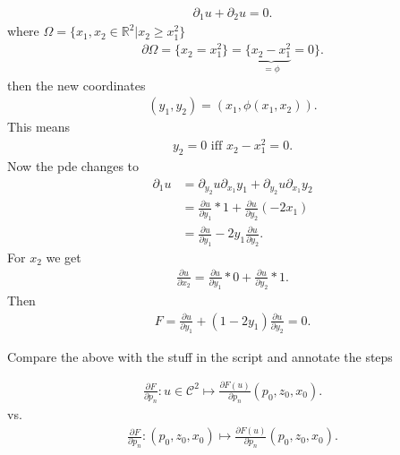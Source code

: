 \begin{example}
 \begin{align*}
  \partial_1 u + \partial_2 u = 0
 .\end{align*} 
 where $\Omega  = \{x_{1},x_{2} \in  \mathbb{R}^{2} | x_{2} \ge x_{1}^2 \}  $
 \begin{align*}
   \partial \Omega  = \{x_{2} = x_{1}^2\}   = \{\underbrace{x_{2}-x_{1}^2}_{= \phi  } = 0\}  
 .\end{align*}
 then the new coordinates 
 \begin{align*}
   (y_{1},y_{2}) = (x_{1},\phi(x_1,x_{2}))
 .\end{align*}
This means 
\begin{align*}
  y_{2} = 0 \text{ iff } x_{2}-x_{1}^2 = 0
.\end{align*}
Now the pde changes to 
\begin{align*}
  \partial_1 u &= \partial_{y_{2}} u \partial_{x_1} y_{1} +   \partial_{y_{2}} u \partial_{x_1} y_{2} \\
               &= \frac{\partial u}{\partial y_{1}}*1 + \frac{\partial u}{\partial y_{2}} (-2x_{1})   \\
               &= \frac{\partial u}{\partial y_{1}} -2y_{1} \frac{\partial u}{\partial y_{2}} 
.\end{align*}
For $x_{2}$ we get 
\begin{align*}
  \frac{\partial u}{\partial x_{2}}  = \frac{\partial u}{\partial y_{1}}*0 + \frac{\partial u}{\partial y_{2}}*1  
.\end{align*}
Then 
\begin{align*}
  F = \frac{\partial u}{\partial y_{1}} + (1-2y_{1})\frac{\partial u}{\partial y_{2}}   = 0
.\end{align*}
\end{example}
\begin{note}
 Compare the above with the stuff in the script and annotate the steps 
\end{note}
\begin{align*}
    \frac{\partial F}{\partial p_n}  : u \in  \mathcal{C}^{2} \mapsto   \frac{\partial F(u)}{\partial p_n}(p_{0},z_{0},x_{0})
.\end{align*}
vs.
\begin{align*}
    \frac{\partial F}{\partial p_n}  : (p_{0},z_{0},x_{0}) \mapsto   \frac{\partial F(u)}{\partial p_n}(p_{0},z_{0},x_{0})
.\end{align*}
